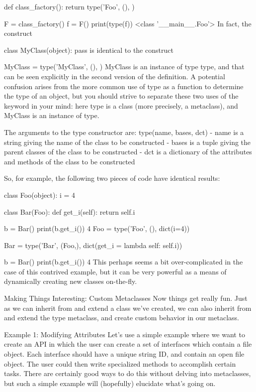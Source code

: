 def class_factory():
    return type('Foo', (), {})

F = class_factory()
f = F()
print(type(f))
<class '__main__.Foo'>
In fact, the construct

class MyClass(object):
    pass
is identical to the construct

MyClass = type('MyClass', (), {})
MyClass is an instance of type type, and that can be seen explicitly in the second version of the definition. A potential confusion arises from the more common use of type as a function to determine the type of an object, but you should strive to separate these two uses of the keyword in your mind: here type is a class (more precisely, a metaclass), and MyClass is an instance of type.

The arguments to the type constructor are: type(name, bases, dct) - name is a string giving the name of the class to be constructed - bases is a tuple giving the parent classes of the class to be constructed - dct is a dictionary of the attributes and methods of the class to be constructed

So, for example, the following two pieces of code have identical results:

class Foo(object):
    i = 4

class Bar(Foo):
    def get_i(self):
        return self.i

b = Bar()
print(b.get_i())
4
Foo = type('Foo', (), dict(i=4))

Bar = type('Bar', (Foo,), dict(get_i = lambda self: self.i))

b = Bar()
print(b.get_i())
4
This perhaps seems a bit over-complicated in the case of this contrived example, but it can be very powerful as a means of dynamically creating new classes on-the-fly.

Making Things Interesting: Custom Metaclasses
Now things get really fun. Just as we can inherit from and extend a class we've created, we can also inherit from and extend the type metaclass, and create custom behavior in our metaclass.

Example 1: Modifying Attributes
Let's use a simple example where we want to create an API in which the user can create a set of interfaces which contain a file object. Each interface should have a unique string ID, and contain an open file object. The user could then write specialized methods to accomplish certain tasks. There are certainly good ways to do this without delving into metaclasses, but such a simple example will (hopefully) elucidate what's going on.

